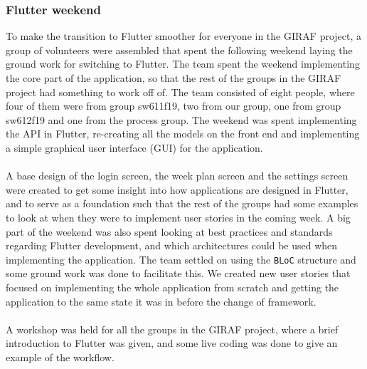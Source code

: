 \subsubsection{Flutter weekend}
To make the transition to Flutter smoother for everyone in the GIRAF project, a group of volunteers were assembled that spent the following weekend laying the ground work for switching to Flutter. 
The team spent the weekend implementing the core part of the application, so that the rest of the groups in the GIRAF project had something to work off of. 
The team consisted of eight people, where four of them were from group sw611f19, two from our group, one from group sw612f19 and one from the process group.
The weekend was spent implementing the API in Flutter, re-creating all the models on the front end and implementing a simple graphical user interface (GUI) for the application.
\\\\
A base design of the login screen, the week plan screen and the settings screen were created to get some insight into how applications are designed in Flutter, and to serve as a foundation such that the rest of the groups had some examples to look at when they were to implement user stories in the coming week.
A big part of the weekend was also spent looking at best practices and standards regarding Flutter development, and which architectures could be used when implementing the application.
The team settled on using the \texttt{BLoC} structure and some ground work was done to facilitate this.
We created new user stories that focused on implementing the whole application from scratch and getting the application to the same state it was in before the change of framework.
\\\\
A workshop was held for all the groups in the GIRAF project, where a brief introduction to Flutter was given, and some live coding was done to give an example of the workflow.

